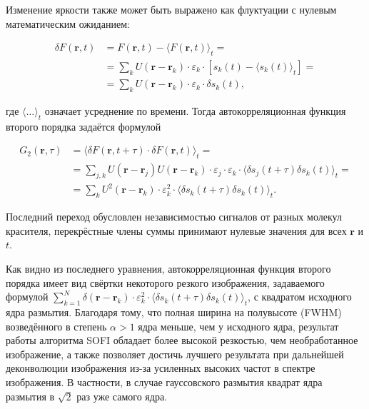 Изменение яркости также может быть выражено как флуктуации с нулевым математическим ожиданием:

\begin{align*}
	\delta F\left(\mathbf{r},t\right) &= F\left(\mathbf{r},t\right)-\langle F\left(\mathbf{r},t\right) \rangle_t = \\
	&= \sum_{k} {U\left(\mathbf{r} - \mathbf{r}_k\right) \cdot \varepsilon_k \cdot \left[ s_k\left(t\right)- \langle s_k\left(t\right) \rangle_t \right]} = \\
	&= \sum_{k} {U\left(\mathbf{r} - \mathbf{r}_k\right) \cdot \varepsilon_k \cdot \delta s_k \left(t\right)},
\end{align*}

\noindent где $\langle \ldots \rangle_t$ означает усреднение по времени. Тогда автокорреляционная функция второго порядка задаётся формулой

\begin{align*}
	G_2\left(\mathbf{r},\tau\right) &= \langle \delta F\left(\mathbf{r},t+\tau\right)\cdot\delta F\left(\mathbf{r},t\right) \rangle_t = \\
	&= \sum_{j,k} {U\left(\mathbf{r}-\mathbf{r}_j\right)U\left(\mathbf{r}-\mathbf{r}_k\right)\cdot\varepsilon_j\cdot\varepsilon_k\cdot \langle \delta s_j\left(t+\tau\right)\delta s_k\left(t\right) \rangle_t} = \\
	&= \sum_{k} {U^2\left(\mathbf{r}-\mathbf{r}_k\right)\cdot\varepsilon_k^2\cdot \langle \delta s_k\left(t+\tau\right)\delta s_k\left(t\right) \rangle_t}.
\end{align*}

Последний переход обусловлен независимостью сигналов от разных молекул красителя, перекрёстные члены суммы принимают нулевые значения для всех $\mathbf{r}$ и $t$.

Как видно из последнего уравнения, автокорреляционная функция второго порядка имеет вид свёртки некоторого резкого изображения, задаваемого формулой $\sum_{k=1}^{N} {\delta(\mathbf{r}-\mathbf{r}_k)\cdot\varepsilon_k^2\cdot \langle \delta s_k\left(t+\tau\right)\delta s_k\left(t\right) \rangle_t}$, с квадратом исходного ядра размытия. Благодаря тому, что полная ширина на полувысоте (FWHM) возведённого в степень $\alpha>1$ ядра меньше, чем у исходного ядра, результат работы алгоритма SOFI обладает более высокой резкостью, чем необработанное изображение, а также позволяет достичь лучшего результата при дальнейшей деконволюции изображения из-за усиленных высоких частот в спектре изображения. В частности, в случае гауссовского размытия квадрат ядра размытия в $\sqrt{2}$ раз уже самого ядра.

